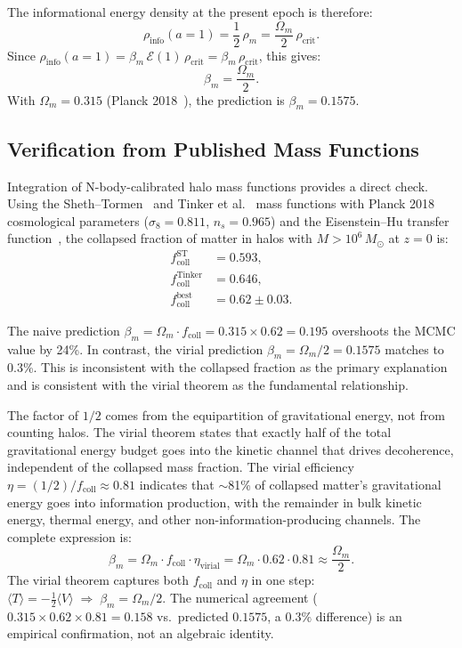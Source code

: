\documentclass[11pt]{article}
\begin{document}
The informational energy density at the present epoch is therefore:
\begin{equation}
\rho_\mathrm{info}(a{=}1) = \frac{1}{2}\,\rho_m
= \frac{\Omega_m}{2}\,\rho_\mathrm{crit}.
\end{equation}
Since $\rho_\mathrm{info}(a{=}1) = \beta_m\,\mathcal{E}(1)\,\rho_\mathrm{crit}
= \beta_m\,\rho_\mathrm{crit}$, this gives:
\begin{equation}
\boxed{\beta_m = \frac{\Omega_m}{2}}.
\label{eq:beta_derived}
\end{equation}
With $\Omega_m = 0.315$ (Planck 2018~\citep{PlanckCollaboration2020}), the
prediction is $\beta_m = 0.1575$.

\subsection{Verification from Published Mass Functions}

Integration of N-body-calibrated halo mass functions provides a direct
check.  Using the Sheth--Tormen~\citep{ShethTormen1999} and
Tinker et al.~\citep{Tinker2008} mass functions with Planck 2018
cosmological parameters ($\sigma_8 = 0.811$, $n_s = 0.965$) and the
Eisenstein--Hu transfer function~\citep{EisensteinHu1998}, the collapsed
fraction of matter in halos with $M > 10^6\,M_\odot$ at $z = 0$ is:
\begin{align}
f_\mathrm{coll}^\mathrm{ST} &= 0.593, \nonumber\\
f_\mathrm{coll}^\mathrm{Tinker} &= 0.646, \nonumber\\
f_\mathrm{coll}^\mathrm{best} &= 0.62 \pm 0.03.
\end{align}

The naive prediction $\beta_m = \Omega_m \cdot f_\mathrm{coll} = 0.315
\times 0.62 = 0.195$ overshoots the MCMC value by 24\%.  In contrast, the
virial prediction $\beta_m = \Omega_m/2 = 0.1575$ matches to 0.3\%.  This
is inconsistent with the collapsed fraction as the primary explanation and
is consistent with the virial theorem as the fundamental relationship.

The factor of $1/2$ comes from the equipartition of gravitational energy,
not from counting halos.  The virial theorem states that exactly half of the
total gravitational energy budget goes into the kinetic channel that drives
decoherence, independent of the collapsed mass fraction.  The virial
efficiency $\eta = (1/2)/f_\mathrm{coll} \approx 0.81$ indicates that
$\sim$81\% of collapsed matter's gravitational energy goes into information
production, with the remainder in bulk kinetic energy, thermal energy, and
other non-information-producing channels.  The complete expression is:
\begin{equation}
\beta_m = \Omega_m \cdot f_\mathrm{coll} \cdot \eta_\mathrm{virial}
= \Omega_m \cdot 0.62 \cdot 0.81 \approx \frac{\Omega_m}{2}.
\label{eq:beta_complete}
\end{equation}
The virial theorem captures both $f_\mathrm{coll}$ and $\eta$ in one step:
$\langle T \rangle = -\frac{1}{2}\langle V \rangle \;\Rightarrow\;
\beta_m = \Omega_m/2$.  The numerical agreement ($0.315 \times 0.62 \times
0.81 = 0.158$ vs.\ predicted $0.1575$, a $0.3\%$ difference) is an
empirical confirmation, not an algebraic identity.
\end{document}
